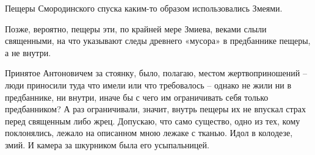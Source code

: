 Пещеры Смородинского спуска каким-то образом использовались Змеями.

Позже, вероятно, пещеры эти, по крайней мере Змиева, веками слыли священными, на что указывают следы древнего «мусора» в предбаннике пещеры, а не внутри.

Принятое Антоновичем за стоянку, было, полагаю, местом жертвоприношений – люди приносили туда что имели или что требовалось – однако не жили ни в предбаннике, ни внутри, иначе бы с чего им ограничивать себя только предбанником? А раз ограничивали, значит, внутрь пещеры их не впускал страх перед священным либо жрец. Допускаю, что само существо, одно из тех, кому поклонялись, лежало на описанном мною лежаке с тканью. Идол в колодезе, змий. И камера за шкурником была его усыпальницей.



